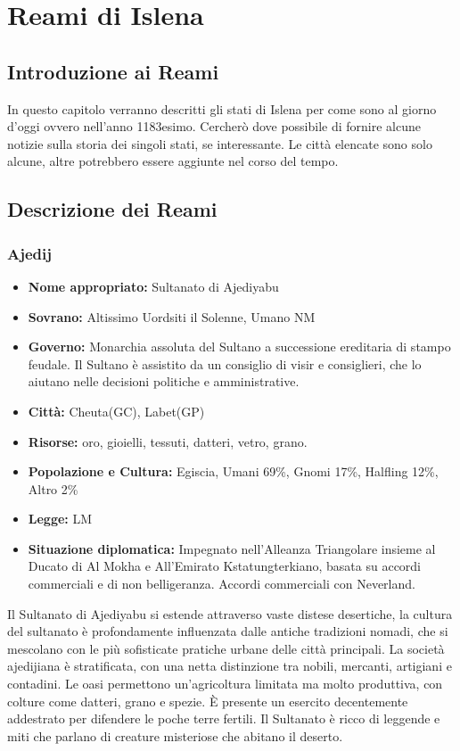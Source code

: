 \documentclass[10pt, a4paper]{report}
\begin{document}
\chapter{Reami di Islena}
\begin{multicols}{2}
	
\section{Introduzione ai Reami}
In questo capitolo verranno descritti gli stati di Islena per come sono al giorno d'oggi ovvero nell'anno 1183esimo. Cercherò dove possibile di fornire alcune notizie sulla storia dei singoli stati, se interessante. Le città elencate sono solo alcune, altre potrebbero essere aggiunte nel corso del tempo.
\section{Descrizione dei Reami}

\subsection*{Ajedij}
\begin{itemize}
	\item \textbf{Nome appropriato:} Sultanato di Ajediyabu
	\item \textbf{Sovrano: }Altissimo Uordsiti il Solenne, Umano NM
	\item \textbf{Governo: }Monarchia assoluta del Sultano a successione ereditaria di stampo feudale. Il Sultano è assistito da un consiglio di visir e consiglieri, che lo aiutano nelle decisioni politiche e amministrative.
	\item \textbf{Città: }Cheuta(GC), Labet(GP)
	\item \textbf{Risorse:}  oro, gioielli, tessuti, datteri, vetro, grano.
	\item \textbf{Popolazione e Cultura:} Egiscia, Umani 69\%, Gnomi 17\%, Halfling 12\%, Altro 2\% 
	\item \textbf{Legge: }LM
	\item \textbf{Situazione diplomatica: }Impegnato nell'Alleanza Triangolare insieme al Ducato di Al Mokha e All'Emirato Kstatungterkiano, basata su accordi commerciali e di non belligeranza. Accordi commerciali con Neverland.
\end{itemize}
Il Sultanato di Ajediyabu si estende attraverso vaste distese desertiche, la cultura del sultanato è profondamente influenzata dalle antiche tradizioni nomadi, che si mescolano con le più sofisticate pratiche urbane delle città principali. La società ajedijiana è stratificata, con una netta distinzione tra nobili, mercanti, artigiani e contadini. Le oasi permettono un'agricoltura limitata ma molto produttiva, con colture come datteri, grano e spezie. \`{E} presente un esercito decentemente addestrato per difendere le poche terre fertili. Il Sultanato è ricco di leggende e miti che parlano di creature misteriose che abitano il deserto.


\end{multicols}
\end{document}
